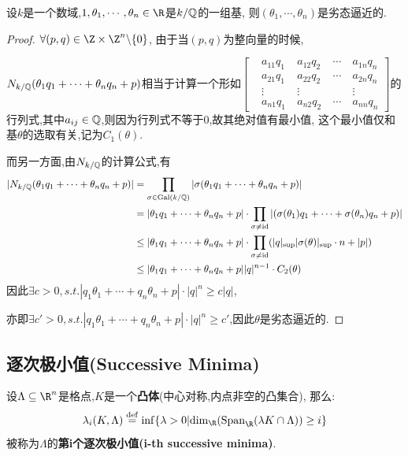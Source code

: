 \begin{theorem}
    设$k$是一个数域,$1,\theta_1, \cdots, \theta_n \in \R$是$k/\mathbb{Q}$的一组基,
    则$(\theta_1, \cdots, \theta_n)$是劣态逼近的.
\end{theorem}
\begin{proof}
    $\forall (p,q) \in \Z \times \Z^n \backslash \{0\}$,
    由于当$(p,q)$为整向量的时候,

    $N_{k/\mathbb{Q}}(\theta_1q_1 + \cdots + \theta_nq_n + p)$相当于计算一个形如$\begin{bmatrix}
        &a_{11}q_1 \ &a_{12}q_2 \ &\cdots \ &a_{1n}q_n \\
        &a_{21}q_1 \ &a_{22}q_2 \ &\cdots \ &a_{2n}q_n \\
        &\vdots \ &\vdots \ & \ &\vdots \\
        &a_{n1}q_1 \ &a_{n2}q_2 \ &\cdots \ &a_{nn}q_n
    \end{bmatrix}$的行列式,其中$a_{ij} \in \mathbb{Q}$,则因为行列式不等于$0$,故其绝对值有最小值,
    这个最小值仅和基$\theta$的选取有关,记为$C_1(\theta)$.

    而另一方面,由$N_{k/\mathbb{Q}}$的计算公式,有
    \begin{align}
        |N_{k/\mathbb{Q}}(\theta_1q_1 + \cdots + \theta_nq_n + p)| &= \prod_{\sigma \in \mathrm{Gal}(k/\mathbb{Q})}|\sigma(\theta_1q_1 + \cdots + \theta_nq_n + p)| \\
    &=|\theta_1q_1 + \cdots + \theta_nq_n + p| \cdot \prod_{\sigma \neq \mathrm{id}} |(\sigma(\theta_1)q_1 + \cdots + \sigma(\theta_n)q_n + p)| \\
    &\leq |\theta_1q_1 + \cdots + \theta_nq_n + p| \cdot \prod_{\sigma \neq \mathrm{id}}(|q|_{\sup}|\sigma(\theta)|_{\sup}\cdot n + |p|)\\
    &\leq |\theta_1q_1 + \cdots + \theta_nq_n + p| |q|^{n-1} \cdot C_2(\theta)
    \end{align}
    因此$\exists c > 0, s.t. |q_1\theta_1 + \cdots + q_n\theta_n + p| \cdot |q|^n \geq c|q|$,

    亦即$\exists c' > 0, s.t. |q_1\theta_1 + \cdots + q_n\theta_n + p| \cdot |q|^n \geq c'$,因此$\theta$是劣态逼近的.

\end{proof}

\subsection{逐次极小值(Successive Minima)}
\begin{definition}
    设$\Lambda \subseteq \R^n$是格点,$K$是一个\textbf{凸体}(中心对称,内点非空的凸集合),
    那么:
    $$\lambda_i(K,\Lambda) \stackrel{\mathrm{def}}{=} \inf \{\lambda > 0 |\mathrm{dim}_{\R}(\mathrm{Span}_{\R} (\lambda K \cap \Lambda) )\geq i\}$$
被称为$\Lambda$的\textbf{第i个逐次极小值(i-th successive minima)}.
\end{definition}

